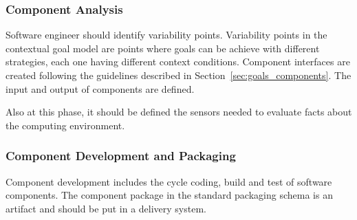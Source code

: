 \subsubsection{Component Analysis}
Software engineer should identify variability points.
Variability points in the contextual goal model are points where goals can be achieve with different strategies, each one having different context conditions.
Component interfaces are created following the guidelines described in Section~\ref{sec:goals_components}. The input and output of components are defined.

Also at this phase, it should be defined the sensors needed to evaluate facts about the computing environment.

\subsubsection{Component Development and Packaging}

Component development includes the cycle coding, build and test of software components.
The component package in the standard packaging schema is an artifact and should be put in a delivery system.
